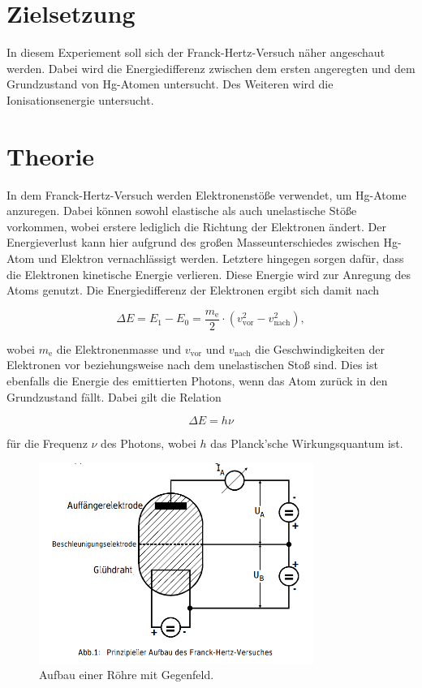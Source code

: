 \section{Zielsetzung}

In diesem Experiement soll sich der Franck-Hertz-Versuch näher angeschaut werden. Dabei wird die Energiedifferenz zwischen dem ersten angeregten und dem Grundzustand von Hg-Atomen untersucht.
Des Weiteren wird die Ionisationsenergie untersucht.

\section{Theorie}
\label{sec:Theorie}

In dem Franck-Hertz-Versuch werden Elektronenstöße verwendet, um Hg-Atome anzuregen.
Dabei können sowohl elastische als auch unelastische Stöße vorkommen, wobei erstere lediglich die Richtung der Elektronen ändert. 
Der Energieverlust kann hier aufgrund des großen Masseunterschiedes zwischen Hg-Atom und Elektron vernachlässigt werden.
Letztere hingegen sorgen dafür, dass die Elektronen kinetische Energie verlieren. Diese Energie wird zur Anregung des Atoms genutzt.
Die Energiedifferenz der Elektronen ergibt sich damit nach

\begin{equation}
    \label{eqn:e-diff}
    \Delta E = E_1 - E_0 = \frac{m_\text{e}}{2} \cdot (v_\text{vor}^2 - v_\text{nach}^2),
\end{equation}

wobei $m_\text{e}$ die Elektronenmasse und $v_\text{vor}$ und $v_\text{nach}$ die Geschwindigkeiten der Elektronen vor beziehungsweise nach dem unelastischen Stoß sind.
Dies ist ebenfalls die Energie des emittierten Photons, wenn das Atom zurück in den Grundzustand fällt. Dabei gilt die Relation

\begin{equation}
    \label{eqn:photon-energie}
    \Delta E = h \nu
\end{equation}

für die Frequenz $\nu$ des Photons, wobei $h$ das Planck'sche Wirkungsquantum ist.

\begin{figure}
    \centering
    \includegraphics[width=0.8\textwidth]{content/fh-roehre.png}
    \caption{Aufbau einer Röhre mit Gegenfeld\cite{V601}.}
    \label{fig:gegenfeld}
\end{figure}

